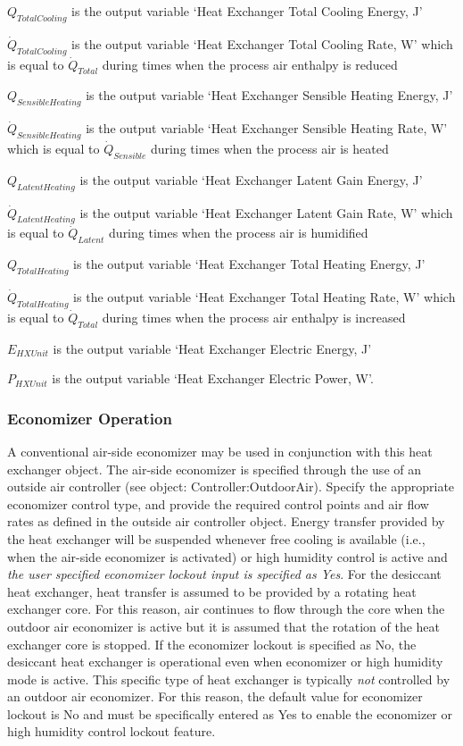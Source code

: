 \(Q_{TotalCooling}\) is the output variable `Heat Exchanger Total Cooling Energy, J'

\({\dot Q_{TotalCooling}}\) is the output variable `Heat Exchanger Total Cooling Rate, W' which is equal to \({\dot Q_{Total}}\) during times when the process air enthalpy is reduced

\(Q_{SensibleHeating}\) is the output variable `Heat Exchanger Sensible Heating Energy, J'

\({\dot Q_{SensibleHeating}}\) is the output variable `Heat Exchanger Sensible Heating Rate, W' which is equal to \({\dot Q_{Sensible}}\) during times when the process air is heated

\(Q_{LatentHeating}\) is the output variable `Heat Exchanger Latent Gain Energy, J'

\({\dot Q_{LatentHeating}}\) is the output variable `Heat Exchanger Latent Gain Rate, W' which is equal to \({\dot Q_{Latent}}\) during times when the process air is humidified

\(Q_{TotalHeating}\) is the output variable `Heat Exchanger Total Heating Energy, J'

\({\dot Q_{TotalHeating}}\) is the output variable `Heat Exchanger Total Heating Rate, W' which is equal to \({\dot Q_{Total}}\) during times when the process air enthalpy is increased

\({E_{HXUnit}}\) is the output variable `Heat Exchanger Electric Energy, J'

\({P_{HXUnit}}\) is the output variable `Heat Exchanger Electric Power, W'.

\subsubsection{Economizer Operation}\label{economizer-operation-2}

A conventional air-side economizer may be used in conjunction with this heat exchanger object. The air-side economizer is specified through the use of an outside air controller (see object: Controller:OutdoorAir). Specify the appropriate economizer control type, and provide the required control points and air flow rates as defined in the outside air controller object. Energy transfer provided by the heat exchanger will be suspended whenever free cooling is available (i.e., when the air-side economizer is activated) or high humidity control is active and \emph{the user specified economizer lockout input is specified as Yes}. For the desiccant heat exchanger, heat transfer is assumed to be provided by a rotating heat exchanger core. For this reason, air continues to flow through the core when the outdoor air economizer is active but it is assumed that the rotation of the heat exchanger core is stopped. If the economizer lockout is specified as No, the desiccant heat exchanger is operational even when economizer or high humidity mode is active. This specific type of heat exchanger is typically \emph{not} controlled by an outdoor air economizer. For this reason, the default value for economizer lockout is No and must be specifically entered as Yes to enable the economizer or high humidity control lockout feature.

